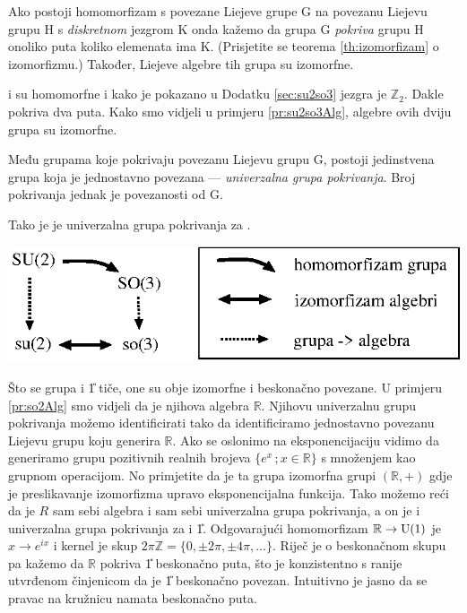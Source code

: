 Ako postoji homomorfizam s povezane Liejeve grupe G na povezanu Liejevu
grupu H s \emph{diskretnom} jezgrom K onda kažemo da grupa G 
\emph{pokriva} grupu H onoliko puta koliko elemenata ima K.
(Prisjetite se teorema \ref{th:izomorfizam} o izomorfizmu.)
Također, Liejeve algebre tih grupa su izomorfne.

\begin{primjer}[\SO{3} i \SU{2}]
 i  su homomorfne i kako je pokazano u Dodatku \ref{sec:su2so3} 
jezgra je $\mathbb{Z}_2$. Dakle  pokriva  dva puta.
Kako smo vidjeli u primjeru \ref{pr:su2so3Alg}, algebre ovih
dviju grupa su izomorfne.
\end{primjer}

\begin{teorem}
Među grupama koje pokrivaju povezanu Liejevu grupu G, postoji jedinstvena
grupa koja je jednostavno povezana --- \emph{univerzalna grupa pokrivanja}.
Broj pokrivanja jednak je povezanosti od G. 
\end{teorem}


Tako je  je univerzalna grupa pokrivanja za .

\centerline{\includegraphics[scale=1.0]{pics/so3pokrivanje.eps}}

Što se grupa  i \U{1} tiče, one su obje izomorfne i beskonačno
povezane. U primjeru \ref{pr:so2Alg} smo vidjeli da je njihova
algebra $\mathbb{R}$.
Njihovu univerzalnu grupu pokrivanja možemo identificirati
tako da identificiramo jednostavno povezanu Liejevu grupu koju
generira $\mathbb{R}$. Ako se oslonimo na eksponencijaciju
vidimo da generiramo grupu pozitivnih realnih brojeva
$\{e^{x}\,; x \in \mathbb{R}\}$ s množenjem kao grupnom operacijom.
No primjetite da je ta grupa izomorfna grupi $(\mathbb{R}, +)$
gdje je preslikavanje izomorfizma upravo eksponencijalna funkcija.
Tako možemo reći da je $R$ sam sebi algebra i sam sebi univerzalna
grupa pokrivanja, a on je i univerzalna grupa pokrivanja za
 i \U{1}. Odgovarajući homomorfizam $\mathbb{R} \to \mathrm{U}(1)$
je $x \to e^{ix}$ i kernel je skup $2\pi\mathbb{Z} = \{0, \pm 2\pi,
\pm 4\pi, \ldots\}$. Riječ je o beskonačnom skupu pa kažemo da
$\mathbb{R}$ pokriva \U{1} beskonačno puta, što je konzistentno
s ranije utvrđenom činjenicom da je \U{1} beskonačno povezan.
Intuitivno je jasno da se pravac na kružnicu namata beskonačno
puta.


